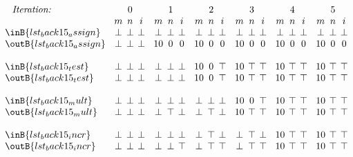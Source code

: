 \begin{minipage}{5in}
\begin{math}
  \setlength{\arraycolsep}{2pt}
  \begin{array}{l@{\phantom{X}}ccc@{\phantom{X}}ccc@{\phantom{X}}ccc@{\phantom{X}}ccc@{\phantom{X}}ccc@{\phantom{X}}ccc}
    \rlap{\hfil\phantom{X}\textit{Iteration:}} &
    & 0 & & 
    & 1 & & 
    & 2 & & 
    & 3 & &
    & 4 & &
    & 5 & \\ 

    & %
    m & n & i & %
    m & n & i & %
    m & n & i & %
    m & n & i & %
    m & n & i & %
    m & n & i \\ %

    \inB{lst_back15_assign} & %
    \bot & \bot & \bot & %
    \bot & \bot & \bot & %
    \bot & \bot & \bot & %
    \bot & \bot & \bot & %
    \bot & \bot & \bot & %
    \bot & \bot & \bot \\ %
    \outB{lst_back15_assign} & %
    \bot & \bot & \bot & %
    10 & 0 & 0 & %
    10 & 0 & 0 & %
    10 & 0 & 0 & %
    10 & 0 & 0 & %
    10 & 0 & 0 \\\\ %

    \inB{lst_back15_test} & %
    \bot & \bot & \bot & %
    \bot & \bot & \bot & %
    10 & 0 & \top & %
    10 & \top & \top & %
    10 & \top & \top & %
    10 & \top & \top\\ %
    \outB{lst_back15_test} & %
    \bot & \bot & \bot & %
    \bot & \bot & \bot & %
    10 & 0 & \top & %
    10 & \top & \top & %
    10 & \top & \top & %
    10 & \top & \top \\\\ %

    \inB{lst_back15_mult} & %
    \bot & \bot & \bot & %
    \bot & \bot & \bot & %
    \bot & \bot & \bot & %
    10 & 0 & \top & %
    10 & \top & \top & %
    10 & \top & \top \\ %
    \outB{lst_back15_mult} & %
    \bot & \bot & \bot & %
    \bot & \top & \bot & %
    \bot & \top & \bot & %
    10 & \top & \top & %
    10 & \top & \top & %
    10 & \top & \top \\\\ %

    \inB{lst_back15_incr} & %
    \bot & \bot & \bot & %
    \bot & \bot & \bot & %
    \bot & \top & \bot & %
    \bot & \top & \bot & %
    10 & \top & \top & %
    10 & \top & \top \\ %
    \outB{lst_back15_incr} & %
    \bot & \bot & \bot & %
    \bot & \bot & \top & %
    \bot & \top & \top & %
    \bot & \top & \top & %
    10 & \top & \top & %
    10 & \top & \top \\\\ %


\end{array}
\end{math}
\end{minipage}
